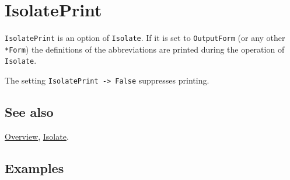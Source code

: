 \documentclass[../FeynCalcManual.tex]{subfiles}
\begin{document}
\hypertarget{isolateprint}{%
\section{IsolatePrint}\label{isolateprint}}

\texttt{IsolatePrint} is an option of \texttt{Isolate}. If it is set to
\texttt{OutputForm} (or any other \texttt{*Form}) the definitions of the
abbreviations are printed during the operation of \texttt{Isolate}.

The setting \texttt{IsolatePrint -> False} suppresses printing.

\subsection{See also}

\hyperlink{toc}{Overview}, \hyperlink{isolate}{Isolate}.

\subsection{Examples}
\end{document}
